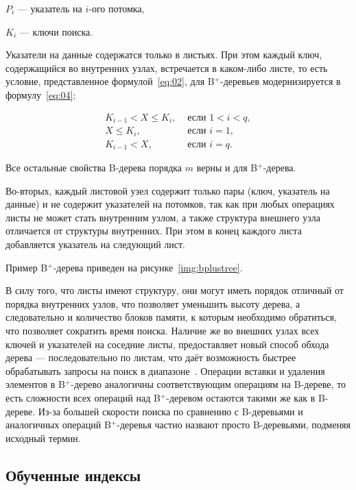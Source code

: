 $P_i$ --- указатель на $i$-ого потомка,

$K_i$ --- ключи поиска.

Указатели на данные содержатся только в листьях. При этом каждый ключ,
содержащийся во внутренних узлах, встречается в каком-либо листе, то есть
условие, представленное формулой~\eqref{eq:02}, для B$^+$-деревьев
модернизируется в формулу~\eqref{eq:04}:

\begin{equation}\label{eq:04}
    \begin{aligned}
        K_{i-1} < X \leqslant K_i, & \text{ если } 1 < i < q,\\
        X \leqslant K_i, & \text{ если } i = 1,\\
        K_{i-1} < X, & \text{ если } i = q.
    \end{aligned}
\end{equation}

Все остальные свойства B-дерева порядка $m$ верны и для B$^+$-дерева.

Во-вторых, каждый листовой узел содержит только пары (ключ, указатель на данные)
и не содержит указателей на потомков, так как при любых операциях листы не может
стать внутренним узлом, а также структура внешнего узла отличается от структуры
внутренних. При этом в конец каждого листа добавляется указатель на следующий
лист.

Пример B$^+$-дерева приведен на рисунке~\ref{img:bplustree}.


В силу того, что листы имеют структуру, они могут иметь порядок отличный от
порядка внутренних узлов, что позволяет уменьшить высоту дерева, а следовательно
и количество блоков памяти, к которым необходимо обратиться, что позволяет
сократить время поиска. Наличие же во внешних узлах всех ключей и указателей на
соседние листы, предоставляет новый способ обхода дерева --- последовательно по
листам, что даёт возможность быстрее обрабатывать запросы на поиск в
диапазоне~\cite{baw}.  Операции вставки и удаления элементов в B$^+$-дерево
аналогичны соответствующим операциям на B-дереве, то есть сложности всех
операций над B$^+$-деревом остаются такими же как в B-дереве. Из-за большей
скорости поиска по сравнению с B-деревьями и аналогичных операций B$^+$-деревья
частно назвают просто B-деревьями, подменяя исходный термин.

\subsection{Обученные индексы}

